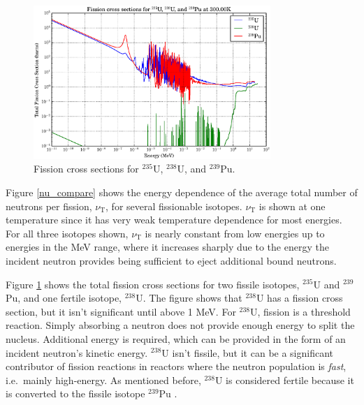 \begin{figure}[h!]
  \centering
    \includegraphics[width=0.8\textwidth]{graphics/xs_fissile.eps}
     \caption{Fission cross sections for $^{235}$U, $^{238}$U, and  $^{239}$Pu. \label{xs_fission_only}}
\end{figure}

Figure \ref{nu_compare} shows the energy dependence of the average total number of neutrons per fission, $\nu_\mathrm{T}$, for several fissionable isotopes.  $\nu_\mathrm{T}$ is shown at one temperature since it has very weak temperature dependence for most energies.   For all three isotopes shown, $\nu_\mathrm{T}$ is nearly constant from low energies up to energies in the MeV range, where it increases sharply due to the energy the incident neutron provides being sufficient to eject additional bound neutrons.  


Figure \ref{xs_fission_only} shows the total fission cross sections for two fissile isotopes, $^{235}$U and $^{239}$Pu, and one fertile isotope, $^{238}$U.  The figure shows that  $^{238}$U has a fission cross section, but it isn't significant until above 1 MeV.  For $^{238}$U, fission is a threshold reaction.  Simply absorbing a neutron does not provide enough energy to split the nucleus.  Additional energy is required, which can be provided in the form of an incident neutron's kinetic energy.  $^{238}$U isn't fissile, but it can be a significant contributor of fission reactions in reactors where the neutron population is \emph{fast}, i.e.\ mainly high-energy.  As mentioned before, $^{238}$U is considered fertile because it is converted to the fissile isotope $^{239}$Pu \cite{duderstadt}.  
  
